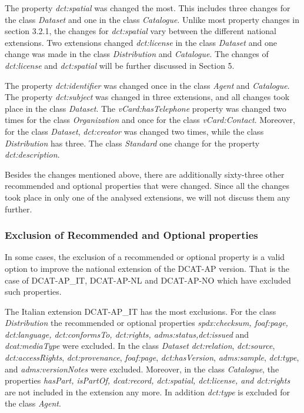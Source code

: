 \documentclass[<options>]{elsarticle}
\begin{document}
The property \textit{dct:spatial} was changed the most. This includes three changes for the class \textit{Dataset} and one in the class \textit{Catalogue}. Unlike most property changes in section 3.2.1, the changes for \textit{dct:spatial} vary between the different national extensions. Two extensions changed \textit{dct:license} in the class \textit{Dataset} and one change was made in the class \textit{Distribution} and \textit{Catalogue}. The changes of \textit{dct:license} and \textit{dct:spatial} will be  further discussed in Section 5. 

The property \textit{dct:identifier} was changed once in the class \textit{Agent} and \textit{Catalogue}. The property \textit{dct:subject} was changed in three extensions, and all changes took place in the class \textit{Dataset}. The \textit{vCard:hasTelephone} property was changed two times for the class \textit{Organization} and once for the class \textit{vCard:Contact}. Moreover, for the class \textit{Dataset}, \textit{dct:creator} was changed two times, while the class \textit{Distribution} has three. The class \textit{Standard} one change for the property \textit{dct:description}.

Besides the changes mentioned above, there are additionally sixty-three other recommended and optional properties that were changed. Since all the changes took place in only one of the analysed extensions, we will not discuss them any further.

\subsubsection*{Exclusion of Recommended and Optional properties}

In some cases, the exclusion of a recommended or optional property is a valid option to improve the national extension of the DCAT-AP version. That is the case of DCAT-AP\_IT, DCAT-AP-NL and DCAT-AP-NO which have excluded such properties.

The Italian extension DCAT-AP\_IT has the most exclusions. For the class \textit{Distribution} the recommended or optional properties \textit{spdx:checksum, foaf:page, dct:language, dct:conformsTo, dct:rights, adms:status,dct:issued} and \\ \textit{dcat:mediaType } were excluded. In the class \textit{Dataset} \textit{dct:relation}, \textit{dct:source}, \textit{dct:accessRights}, \textit{dct:provenance}, \textit{foaf:page}, \textit{dct:hasVersion}, \textit{adms:sample}, \textit{dct:type}, and \textit{adms:versionNotes} were excluded. Moreover, in the class \textit{Catalogue}, the properties \textit{hasPart, isPartOf, dcat:record, dct:spatial, dct:license, and dct:rights} are not included in the extension any more. In addition \textit{dct:type} is excluded for the class \textit{Agent}.
\end{document}
